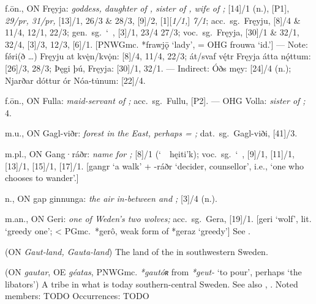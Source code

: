\begin{itemize}
 f.ōn., ON Fręyja:
  \emph{goddess, daughter of , sister of , wife of ;} [14]/1 (n.), [P1], \emph{29/pr, 31/pr,} [13]/1, 26/3 \& 28/3, [9]/2, [1][\emph{1/1,}] \emph{7/1};
  acc.~sg.~Fręyju, [8]/4 \& 11/4, 12/1, 22/3;
  gen.~sg.~\char`~, [3]/1, 23/4 27/3;
  voc.~sg.~Fręyja, [30]/1 \& 32/1, 32/4, [3]/3, 12/3, [6]/1.
  [PNWGmc. *frawjǭ ‘lady’, = OHG frouwa ‘id.’]
  --- Note: fǿri(ð \dots) Fręyju at kvę̇n/kvǫ̇n: [8]/4, 11/4, 22/3; át/svaf vę́tr Fręyja átta nǫ́ttum: [26]/3, 28/3; Þęgi þú, Fręyja: [30]/1, 32/1.
  --- Indirect: Óðs męy: [24]/4 (n.); Njarðar dóttur ór Nóa-tu̇num: [22]/4.

 f.ōn., ON Fulla:
  \emph{maid-servant of ;} acc.~sg.~Fullu, [P2].
  --- OHG Volla: \emph{sister of ;}  4.

 m.u., ON Gagl-viðr:
  \emph{forest in the East, perhaps = ;} dat.~sg.~Gagl-viði, [41]/3.

 m.pl., ON Gang·ráðr:
  \emph{name for ;} [8]/1 (\char`~\ hęiti’k); voc.~sg.~\char`~, [9]/1, [11]/1, [13]/1, [15]/1, [17]/1.
  [gangr ‘a walk’ + -ráðr ‘decider, counsellor’, i.e., ‘one who chooses to wander’.]

 n., ON gap ginnunga:
  \emph{the air in-between  and ;} [3]/4 (n.).

 m.an., ON Geri:
  \emph{one of Weden’s two wolves;} acc.~sg.~Gera, [19]/1.
  [geri ‘wolf’, lit. ‘greedy one’; < PGmc.~*gerô, weak form of *geraz ‘greedy’]
  See .

 (ON \emph{Gaut-land, Gauta-land})
  The land of the  in southwestern Sweden.

 (ON \emph{gautar}, OE \emph{géatas}, PNWGmc. \emph{*gautóʀ} from \emph{*geut-} ‘to pour’, perhaps ‘the libators’)
  A tribe in what is today southern-central Sweden. See also , .
  Noted members: TODO
  Occurrences: TODO


\end{itemize}
